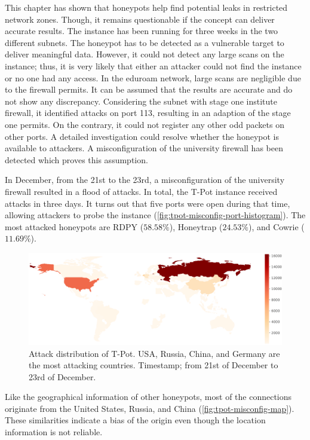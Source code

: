 This chapter has shown that honeypots help find potential leaks in restricted network zones.
Though, it remains questionable if the concept can deliver accurate results.
The instance has been running for three weeks in the two different subnets.
The honeypot has to be detected as a vulnerable target to deliver meaningful data.
However, it could not detect any large scans on the instance; thus, it is very likely that either an attacker could not find the instance or no one had any access.
In the eduroam network, large scans are negligible due to the firewall permits.
It can be assumed that the results are accurate and do not show any discrepancy.
Considering the subnet with stage one institute firewall, it identified attacks on port 113, resulting in an adaption of the stage one permits.
On the contrary, it could not register any other odd packets on other ports.
A detailed investigation could resolve whether the honeypot is available to attackers.
A misconfiguration of the university firewall has been detected which proves this assumption.

In December, from the 21st to the 23rd, a misconfiguration of the university firewall resulted in a flood of attacks.
In total, the T-Pot instance received  attacks in three days.
It turns out that five ports were open during that time, allowing attackers to probe the instance (\autoref{fig:tpot-misconfig-port-histogram}).
The most attacked honeypots are RDPY ($58.58\%$), Honeytrap ($24.53\%$), and Cowrie ($11.69\%$).

\begin{figure}
    \centering
    \includegraphics[width=\textwidth]{figures/tpot-misconfig-overview-map.pdf}
    \caption[Attack distribution of T-Pot]{
        Attack distribution of T-Pot.
        USA, Russia, China, and Germany are the most attacking countries.
        Timestamp; from 21st of December to 23rd of December.
    }
    \label{fig:tpot-misconfig-map}
\end{figure}

Like the geographical information of other honeypots, most of the connections originate from the United States, Russia, and China (\autoref{fig:tpot-misconfig-map}).
These similarities indicate a bias of the origin even though the location information is not reliable.

